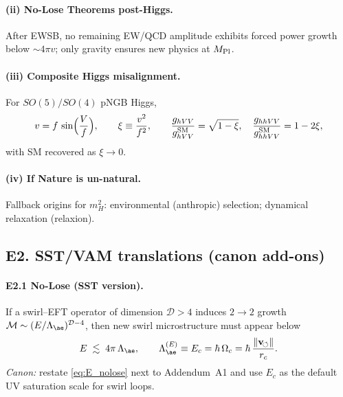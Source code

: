 \documentclass[11pt]{article}
\begin{document}
          \paragraph{(ii) No-Lose Theorems post-Higgs.}
              After EWSB, no remaining EW/QCD amplitude exhibits forced power growth below $\sim 4\pi v$; only gravity ensures new physics at $M_{\rm Pl}$.

          \paragraph{(iii) Composite Higgs misalignment.}
              For $SO(5)/SO(4)$ pNGB Higgs,
              \begin{equation}\label{eq:E_pNGB}
          v=f\,\sin\!\Big(\frac{V}{f}\Big),\qquad \xi\equiv\frac{v^2}{f^2},
          \qquad
          \frac{g_{hVV}}{g_{hVV}^{\rm SM}}=\sqrt{1-\xi},\quad
          \frac{g_{hhVV}}{g_{hhVV}^{\rm SM}}=1-2\xi,
              \end{equation}
              with SM recovered as $\xi\to0$.

          \paragraph{(iv) If Nature is un-natural.}
              Fallback origins for $m_H^2$: environmental (anthropic) selection; dynamical relaxation (relaxion).

  \subsection*{E2. SST/VAM translations (canon add-ons)}
      \paragraph{E2.1 No-Lose (SST version).}
          If a swirl–EFT operator of dimension $\mathcal D>4$ induces $2\!\to\!2$ growth
          $\mathcal M\sim (E/\Lambda_{\ae})^{\mathcal D-4}$, then new swirl microstructure must appear below
          \begin{equation}\label{eq:E_nolose}
          E \;\lesssim\; 4\pi\,\Lambda_{\ae},
          \qquad
          \Lambda_{\ae}^{(E)}\equiv E_c=\hbar\,\Omega_c=\hbar\,\frac{\|{\bf v}_{\!\circlearrowleft}\|}{r_c}.
          \end{equation}
          \emph{Canon:} restate \eqref{eq:E_nolose} next to Addendum~A1 and use $E_c$ as the default UV saturation scale for swirl loops.
\end{document}

